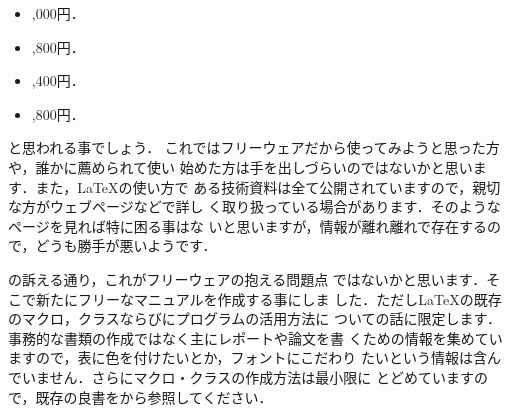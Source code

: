 \begin{itemize}
\item \wasyo{\LMANUAL}\cite{latexbook},000円．
\item \wasyo{\COMP}\cite{latexcomp},800円．
\item \wasyo{\GCOMP}\cite{graphicscomp},400円．
\item \wasyo{\WCOMP}\cite{webcomp},800円．
\end{itemize}

と思われる事でしょう．
これではフリーウェアだから使ってみようと思った方や，誰かに薦められて使い
始めた方は手を出しづらいのではないかと思います．また，{\LaTeX}の使い方で
ある技術資料は全て公開されていますので，親切な方がウェブページなどで詳し
く取り扱っている場合があります．そのようなページを見れば特に困る事はな
いと思いますが，情報が離れ離れで存在するので，どうも勝手が悪いようです．

の訴える通り，これがフリーウェアの抱える問題点
ではないかと思います．そこで新たにフリーなマニュアルを作成する事にしま
した．ただし{\LaTeX}の既存のマクロ，クラスならびにプログラムの活用方法に
ついての話に限定します．事務的な書類の作成ではなく主にレポートや論文を書
くための情報を集めていますので，表に色を付けたいとか，フォントにこだわり
たいという情報は含んでいません．さらにマクロ・クラスの作成方法は最小限に
とどめていますので，既存の良書をから参照してください．


